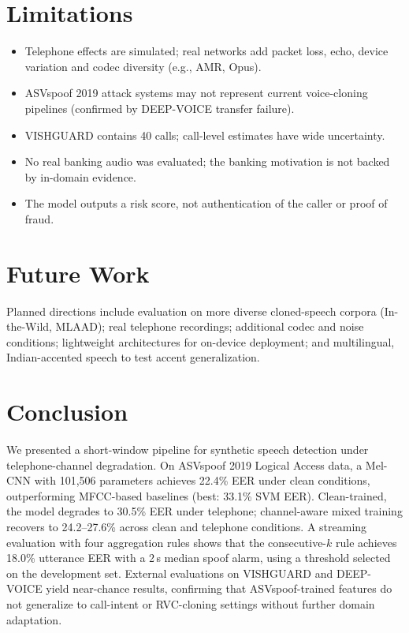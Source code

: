 \documentclass[conference]{IEEEtran}
\begin{document}
\section{Limitations}

\begin{itemize}
  \item Telephone effects are simulated; real networks add packet loss, echo, device variation and codec diversity (e.g., AMR, Opus).
  \item ASVspoof 2019 attack systems may not represent current voice-cloning pipelines (confirmed by DEEP-VOICE transfer failure).
  \item VISHGUARD contains 40 calls; call-level estimates have wide uncertainty.
  \item No real banking audio was evaluated; the banking motivation is not backed by in-domain evidence.
  \item The model outputs a risk score, not authentication of the caller or proof of fraud.
\end{itemize}

\section{Future Work}

Planned directions include evaluation on more diverse cloned-speech corpora (In-the-Wild, MLAAD); real telephone recordings; additional codec and noise conditions; lightweight architectures for on-device deployment; and multilingual, Indian-accented speech to test accent generalization.

\section{Conclusion}

We presented a short-window pipeline for synthetic speech detection under telephone-channel degradation. On ASVspoof 2019 Logical Access data, a Mel-CNN with 101,506 parameters achieves 22.4\% EER under clean conditions, outperforming MFCC-based baselines (best: 33.1\% SVM EER). Clean-trained, the model degrades to 30.5\% EER under telephone; channel-aware mixed training recovers to 24.2--27.6\% across clean and telephone conditions. A streaming evaluation with four aggregation rules shows that the consecutive-$k$ rule achieves 18.0\% utterance EER with a 2\,s median spoof alarm, using a threshold selected on the development set. External evaluations on VISHGUARD and DEEP-VOICE yield near-chance results, confirming that ASVspoof-trained features do not generalize to call-intent or RVC-cloning settings without further domain adaptation.
\end{document}
